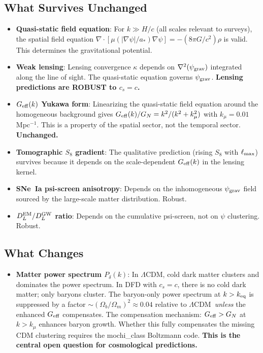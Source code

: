 \documentclass[11pt,a4paper]{article}
\newcommand{\LCDM}{$\Lambda$CDM}
\newcommand{\kmu}{k_\mu}
\newcommand{\Geff}{G_{\rm eff}}
\begin{document}
\begin{crisisbox}[$c_s = c$ --- WHAT EXACTLY CHANGES]
\subsection{What Survives Unchanged}

\begin{itemize}[nosep]
\item \textbf{Quasi-static field equation}: For $k \gg H/c$ (all
  scales relevant to surveys), the spatial field equation
  $\nabla\cdot[\mu(|\nabla\psi|/a_*)\nabla\psi] = -(8\pi G/c^2)\rho$
  is valid. This determines the gravitational potential.
\item \textbf{Weak lensing}: Lensing convergence $\kappa$ depends on
  $\nabla^2(\psi_{\rm grav})$ integrated along the line of sight.
  The quasi-static equation governs $\psi_{\rm grav}$.
  \textbf{Lensing predictions are ROBUST to $c_s = c$.}
\item \textbf{$\Geff(k)$ Yukawa form}: Linearizing the quasi-static
  field equation around the homogeneous background gives
  $\Geff(k)/G_N = k^2/(k^2 + \kmu^2)$ with $\kmu = 0.01$\,Mpc$^{-1}$.
  This is a property of the spatial sector, not the temporal sector.
  \textbf{Unchanged.}
\item \textbf{Tomographic $S_8$ gradient}: The qualitative prediction
  (rising $S_8$ with $\ell_{\rm max}$) survives because it depends
  on the scale-dependent $\Geff(k)$ in the lensing kernel.
\item \textbf{SNe~Ia psi-screen anisotropy}: Depends on the
  inhomogeneous $\psi_{\rm grav}$ field sourced by the large-scale
  matter distribution. Robust.
\item \textbf{$D_L^{\rm EM}/D_L^{\rm GW}$ ratio}: Depends on the
  cumulative psi-screen, not on $\psi$ clustering. Robust.
\end{itemize}

\subsection{What Changes}

\begin{itemize}[nosep]
\item \textbf{Matter power spectrum $P_\delta(k)$}: In \LCDM, cold
  dark matter clusters and dominates the power spectrum. In DFD with
  $c_s = c$, there is no cold dark matter; only baryons cluster.
  The baryon-only power spectrum at $k > k_{\rm eq}$ is suppressed
  by a factor $\sim (\Omega_b/\Omega_m)^2 \approx 0.04$ relative
  to \LCDM\ \emph{unless} the enhanced $\Geff$ compensates.
  The compensation mechanism: $\Geff > G_N$ at $k > \kmu$ enhances
  baryon growth. Whether this fully compensates the missing CDM
  clustering requires the mochi\_class Boltzmann code.
  \textbf{This is the central open question for cosmological
  predictions.}


\end{itemize}
\end{crisisbox}
\end{document}

